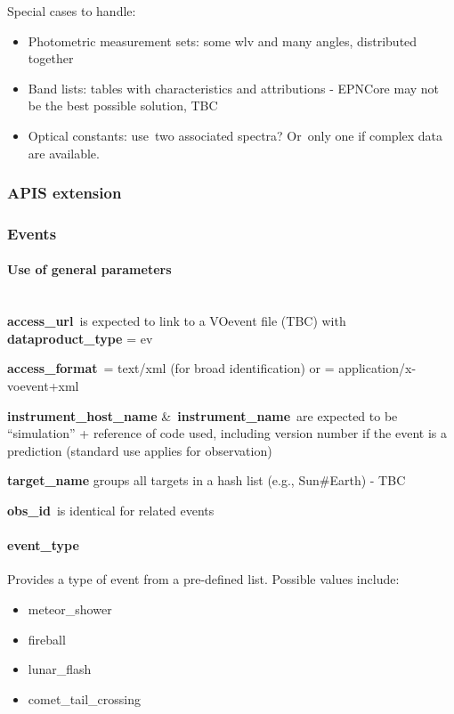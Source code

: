 \documentclass[11pt,a4paper]{ivoa}
\begin{document}
Special cases to handle:

\begin{itemize}
\item Photometric measurement sets: some wlv and many angles, distributed together
\item Band lists: tables with characteristics and attributions - EPNCore may not be the best possible solution, TBC
\item Optical constants: use two associated spectra? Or only one if complex data are available.
\end{itemize}

\subsubsection{APIS extension\\}

\subsubsection{Events\\}

\paragraph{Use of general parameters\textbf{ }}

\\

\textbf{access\_url} is expected to link to a VOevent file (TBC) with \textbf{dataproduct\_type} = ev 

\textbf{access\_format} = text/xml (for broad identification) or = application/x-voevent+xml 

\textbf{instrument\_host\_name }\& \textbf{instrument\_name} are expected to be ``simulation'' + reference of code used, including version number if the event is a prediction (standard use applies for observation)

\textbf{target\_name} groups all targets in a hash list (e.g., Sun\#Earth) - TBC

\textbf{obs\_id} is identical for related events

\paragraph{event\_type}

Provides a type of event from a pre-defined list. Possible values include:

\begin{itemize}
\item meteor\_shower
\item fireball
\item lunar\_flash
\item comet\_tail\_crossing
\end{itemize}
\end{document}
